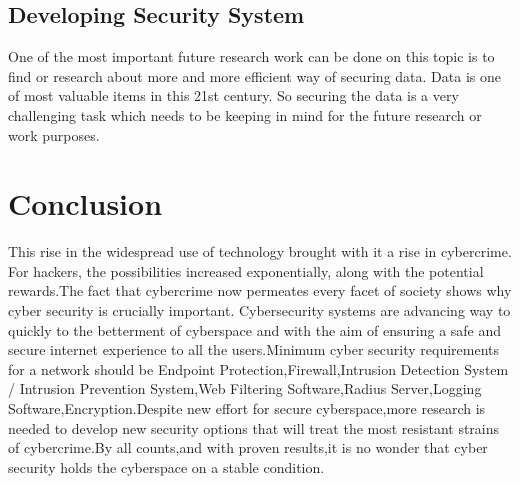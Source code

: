 \documentclass[conference]{IEEEtran}
\begin{document}
	\subsection{Developing Security System}
	One of the most important future research work can be done on this topic is to find or research about more and more efficient way of securing data. Data is one of most valuable items in this 21st century. So securing the data is a very challenging task which needs to be keeping in mind for the future research or work purposes.
	
	
	\section{Conclusion} 
	This rise in the widespread use of technology
	brought with it a rise in cybercrime. For hackers, the
	possibilities increased exponentially, along with the
	potential rewards.The fact that cybercrime now permeates every facet of society shows why cyber security is crucially important. Cybersecurity systems are advancing way to quickly to the betterment of cyberspace and with the aim of ensuring a safe and secure internet
	experience to all the users.Minimum cyber security requirements for a network should be Endpoint Protection,Firewall,Intrusion Detection System / Intrusion Prevention System,Web Filtering Software,Radius Server,Logging Software,Encryption.Despite new effort for secure cyberspace,more research is needed to develop new security options that will treat the most resistant strains of cybercrime.By all counts,and with proven results,it is no wonder that cyber security holds the cyberspace on a stable condition.


\printbibliography
\end{document}
